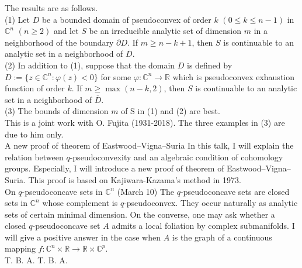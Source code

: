 \documentclass[a4]{article}
\theoremstyle{plain} %
\theoremstyle{definition} %
\begin{document}
The results are as follows. \\
(1) Let $D$ be a bounded domain of pseudoconvex of order $k$ $(0 \leq k \leq n-1)$ in $\mathbb{C}^n$ $(n \geq 2)$ and let $S$ be an irreducible analytic set of dimension
$m$ in a neighborhood of the boundary $\partial D$. If $m \geq n - k + 1$, then $S$ is
continuable to an analytic set in a neighborhood of $\overline{D}$.\\
(2) In addition to (1), suppose that the domain $D$ is defined by $D :=
\{ z\in \mathbb{C}^n : \varphi(z) < 0\}$ for some $\varphi\colon \mathbb{C}^n \to \mathbb{R}$ which is pseudoconvex exhaustion function of order $k$. 
If $m \geq \max (n-k, 2)$, then $S$ is continuable to an analytic set in a neighborhood of $\overline{D}$. \\
(3) The bounds of dimension $m$ of S in (1) and (2) are best.\\
This is a joint work with O. Fujita (1931-2018). 
\noindent The three examples in (3) are due to him only.
\vskip5mm
\\
A new proof of  theorem of Eastwood--Vigna--Suria
\vskip3mm
In this talk, I will explain the relation between $q$-pseudoconvexity and an algebraic condition of cohomology groups. Especially, I will introduce a new proof of theorem of Eastwood--Vigna--Suria. This proof is based on Kajiwara-Kazama's method in 1973.
\vskip5mm
\\
On $q$-pseudoconcave sets in $\mathbb{C}^n$  (March 10)
\vskip3mm
The $q$-pseudoconcave sets are closed sets in $\mathbb{C}^n$ whose complement is $q$-pseudoconvex. They occur naturally as analytic sets of certain minimal dimension. On the converse, one may ask whether a closed $q$-pseudoconcave set $A$ admits a local foliation by complex submanifolds. I will give a positive answer in the case when $A$ is the graph of a continuous mapping $f\colon \mathbb{C}^n\times\mathbb{R}\to\mathbb{R}\times \mathbb{C}^p$. 
\vskip5mm
\\
T. B. A. 
\vskip3mm
T. B. A. 
\end{document}
